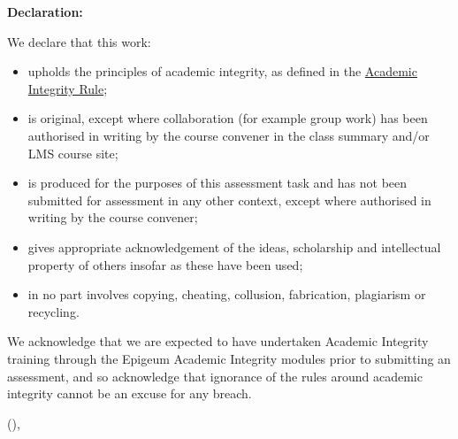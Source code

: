 \ifLongThesisStyle
{\sffamily\bfseries\Large Declaration:}\\
\fi



We declare that this work:
\begin{itemize}
  \item upholds the principles of academic integrity, as defined in the \href{https://www.legislation.gov.au/Details/F2021L00997}{Academic Integrity Rule};
  \item is original, except where collaboration (for example group work) has been authorised in writing by the course convener in the class summary and/or LMS course site;
  \item is produced for the purposes of this assessment task and has not been submitted for assessment in any other context, except where authorised in writing by the course convener;
  \item gives appropriate acknowledgement of the ideas, scholarship and intellectual property of others insofar as these have been used;
  \item in no part involves copying, cheating, collusion, fabrication, plagiarism or recycling.
\end{itemize}

We acknowledge that we are expected to have undertaken Academic Integrity training through the Epigeum Academic Integrity modules prior to submitting an assessment, and so acknowledge that ignorance of the rules around academic integrity cannot be an excuse for any breach.

\vspace{.25 cm}
{\parfillskip=0pt\hfill \monthname{} (\the\year), \AuthorName\par}